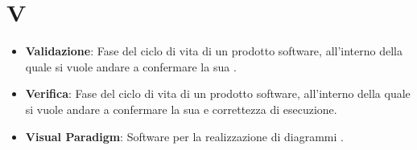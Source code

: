 \section*{V}
\begin{itemize}
	\item
	\textbf{Validazione}: Fase del ciclo di vita di un prodotto software, all'interno della quale si vuole andare a confermare la sua .
	\item
	\textbf{Verifica}: Fase del ciclo di vita di un prodotto software, all'interno della quale si vuole andare a confermare la sua  e correttezza di esecuzione.
	\item
	\textbf{Visual Paradigm}: Software per la realizzazione di diagrammi .
\end{itemize}
\newpage